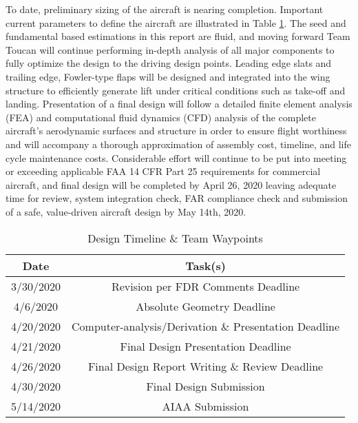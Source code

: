 \begin{singlespace}
\begin{table}[!h]
\begin{tabular}{ |c|c|c|c|c|c| }
    \end{tabular}\label{tab:ataglance}
\end{table}

To date, preliminary sizing of the aircraft is nearing completion.  Important current parameters to define the aircraft are illustrated in Table \ref{tab:ataglance}.  The seed and fundamental based estimations in this report are fluid, and moving forward Team Toucan will continue performing in-depth analysis of all major components to fully optimize the design to the driving design points.  Leading edge slats and trailing edge,  Fowler-type flaps will be designed and integrated into the wing structure to efficiently generate lift under critical conditions such as take-off and landing.  Presentation of a final design will follow a detailed finite element analysis (FEA) and computational fluid dynamics (CFD) analysis of the complete aircraft's aerodynamic surfaces and structure in order to ensure flight worthiness and will accompany a thorough approximation of assembly cost, timeline, and life cycle maintenance costs.  Considerable effort will continue to be put into meeting or exceeding applicable FAA 14 CFR Part 25 requirements for commercial aircraft, and final design will be completed by April 26, 2020 leaving adequate time for review, system integration check, FAR compliance check and submission of a safe, value-driven aircraft design by May 14th, 2020.

\begin{table}[h!] 
    \centering
    \caption{Design Timeline $\&$ Team Waypoints}
    \begin{tabular}{ |c||c| }\toprule
    \textbf{Date} & \textbf{Task(s)} \\\hline\hline
    3/30/2020 & Revision per FDR Comments Deadline \\\hline
    4/6/2020 & Absolute Geometry Deadline \\ \hline
    4/20/2020 & Computer-analysis/Derivation $\&$ Presentation Deadline \\ \hline
    4/21/2020 & Final Design Presentation Deadline \\ \hline
    4/26/2020 & Final Design Report Writing $\&$ Review Deadline \\ \hline
    4/30/2020 & Final Design Submission \\ \hline
    5/14/2020 & AIAA Submission \\\hline
    \end{tabular}\label{deadlines}
\end{table}

\end{singlespace}

